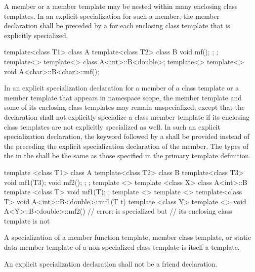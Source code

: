 \pnum
A member or a member template may be nested within many enclosing class
templates.
In an explicit specialization for such a member,
the member declaration shall be preceded by a
for each enclosing class template that is explicitly specialized.
\begin{example}
\begin{codeblock}
template<class T1> class A {
  template<class T2> class B {
    void mf();
  };
};
template<> template<> class A<int>::B<double>;
template<> template<> void A<char>::B<char>::mf();
\end{codeblock}
\end{example}

\pnum
In an explicit specialization declaration for a member of a class template or
a member template that appears in namespace scope,
the member template and some of its enclosing class templates may remain
unspecialized,
except that the declaration shall not explicitly specialize a class member
template if its enclosing class templates are not explicitly specialized
as well.
In such an explicit specialization declaration, the keyword
followed by a
shall be provided instead of the
preceding the explicit specialization declaration of the member.
The types of the
in the
shall be the same as those specified in the primary template definition.
\begin{example}
\begin{codeblock}
template <class T1> class A {
  template<class T2> class B {
    template<class T3> void mf1(T3);
    void mf2();
  };
};
template <> template <class X>
  class A<int>::B {
      template <class T> void mf1(T);
  };
template <> template <> template<class T>
  void A<int>::B<double>::mf1(T t) { }
template <class Y> template <>
  void A<Y>::B<double>::mf2() { }       // error:  is specialized but
                                        // its enclosing class template  is not
\end{codeblock}
\end{example}

\pnum
A specialization of a member function template, member class template,
or static data member template of
a non-specialized class template is itself a template.

\pnum
An explicit specialization declaration shall not be a friend declaration.

